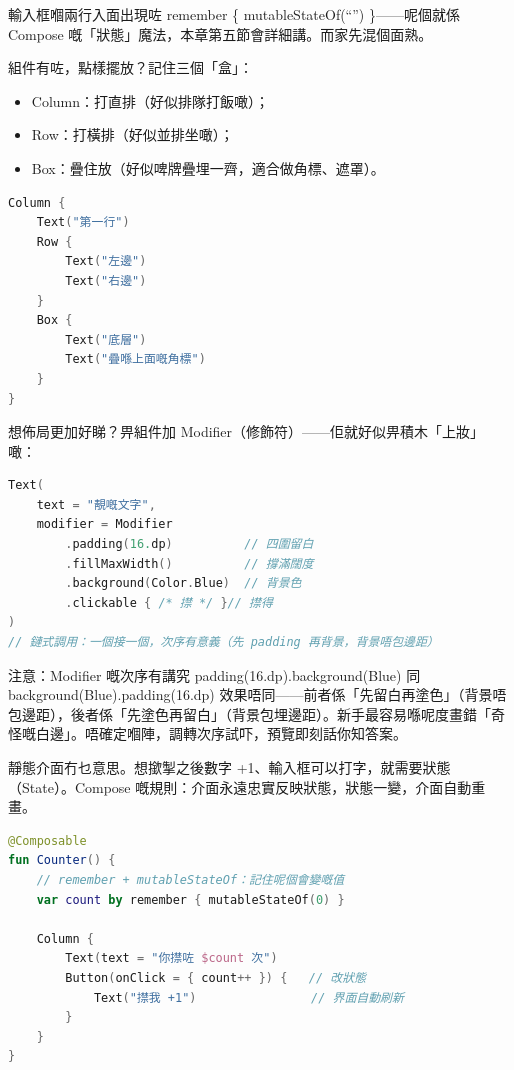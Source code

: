 輸入框嗰兩行入面出現咗 remember \{ mutableStateOf(“”) \}——呢個就係 Compose 嘅「狀態」魔法，本章第五節會詳細講。而家先混個面熟。


組件有咗，點樣擺放？記住三個「盒」：

\begin{itemize}
  \item Column：打直排（好似排隊打飯噉）；
  \item Row：打橫排（好似並排坐噉）；
  \item Box：疊住放（好似啤牌疊埋一齊，適合做角標、遮罩）。
\end{itemize}

\begin{lstlisting}[language=Kotlin]
Column {
    Text("第一行")
    Row {
        Text("左邊")
        Text("右邊")
    }
    Box {
        Text("底層")
        Text("疊喺上面嘅角標")
    }
}
\end{lstlisting}

想佈局更加好睇？畀組件加 Modifier（修飾符）——佢就好似畀積木「上妝」噉：

\begin{lstlisting}[language=Kotlin]
Text(
    text = "靚嘅文字",
    modifier = Modifier
        .padding(16.dp)          // 四圍留白
        .fillMaxWidth()          // 撐滿闊度
        .background(Color.Blue)  // 背景色
        .clickable { /* 㩒 */ }// 㩒得
)
// 鏈式調用：一個接一個，次序有意義（先 padding 再背景，背景唔包邊距）
\end{lstlisting}

\begin{tcbwarn}{注意：Modifier 嘅次序有講究}
padding(16.dp).background(Blue) 同 background(Blue).padding(16.dp) 效果唔同——前者係「先留白再塗色」（背景唔包邊距），後者係「先塗色再留白」（背景包埋邊距）。新手最容易喺呢度畫錯「奇怪嘅白邊」。唔確定嗰陣，調轉次序試吓，預覽即刻話你知答案。

\end{tcbwarn}


靜態介面冇乜意思。想撳掣之後數字 +1、輸入框可以打字，就需要狀態（State）。Compose 嘅規則：介面永遠忠實反映狀態，狀態一變，介面自動重畫。

\begin{lstlisting}[language=Kotlin]
@Composable
fun Counter() {
    // remember + mutableStateOf：記住呢個會變嘅值
    var count by remember { mutableStateOf(0) }

    Column {
        Text(text = "你㩒咗 $count 次")
        Button(onClick = { count++ }) {   // 改狀態
            Text("㩒我 +1")                // 界面自動刷新
        }
    }
}
\end{lstlisting}

